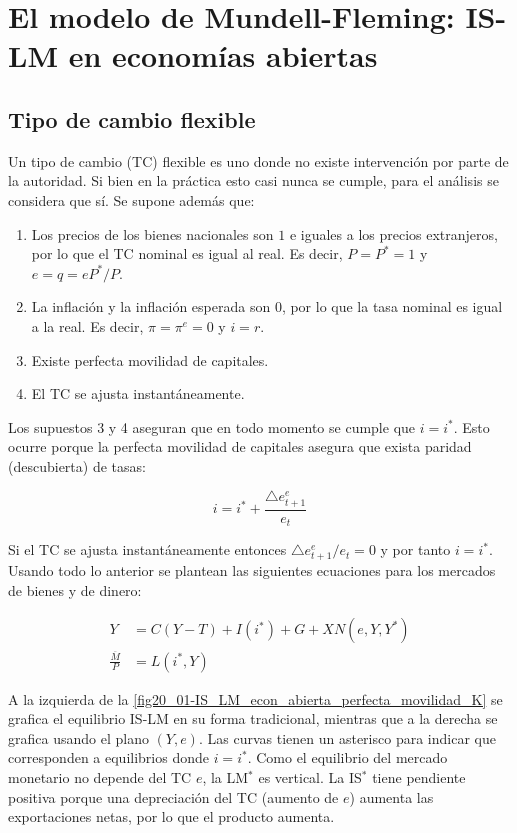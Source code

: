 \documentclass[DeGregorioResumen]{subfiles}
\begin{document}
\setcounter{section}{19}
\section{El modelo de Mundell-Fleming: IS-LM en economías abiertas}

\subsection{Tipo de cambio flexible}

Un tipo de cambio (TC) flexible es uno donde no existe intervención por parte de la autoridad. Si bien en la práctica esto casi nunca se cumple, para el análisis se considera que sí. Se supone además que:

\begin{enumerate}
	\item Los precios de los bienes nacionales son $1$ e iguales a los precios extranjeros, por lo que el TC nominal es igual al real. Es decir, $P=P^*=1$ y $e=q=eP^*/P$.
	\item La inflación y la inflación esperada son $0$, por lo que la tasa nominal es igual a la real. Es decir, $\pi=\pi^e=0$ y $i=r$.
	\item Existe perfecta movilidad de capitales.
	\item El TC se ajusta instantáneamente. 
\end{enumerate}

Los supuestos 3 y 4 aseguran que en todo momento se cumple que $i=i^*$. Esto ocurre porque la perfecta movilidad de capitales asegura que exista paridad (descubierta) de tasas:

\begin{equation*}
	i=i^* + \frac{\bigtriangleup e^e_{t+1}}{e_t}
\end{equation*}

Si el TC se ajusta instantáneamente entonces $\bigtriangleup e^e_{t+1}/e_t=0$ y por tanto $i=i^*$. Usando todo lo anterior se plantean las siguientes ecuaciones para los mercados de bienes y de dinero:

\begin{align}
	Y &= C(Y-T) + I(i^*) + G + XN(e, Y, Y^*) \\
	\frac{\overline M}{P} &= L(i^*, Y)	
\end{align}



A la izquierda de la \autoref{fig20_01-IS_LM_econ_abierta_perfecta_movilidad_K} se grafica el equilibrio IS-LM en su forma tradicional, mientras que a la derecha se grafica usando el plano $(Y, e)$. Las curvas tienen un asterisco para indicar que corresponden a equilibrios donde $i=i^*$. Como el equilibrio del mercado monetario no depende del TC $e$, la LM$^*$ es vertical. La IS$^*$ tiene pendiente positiva porque una depreciación del TC (aumento de $e$) aumenta las exportaciones netas, por lo que el producto aumenta.
\end{document}
